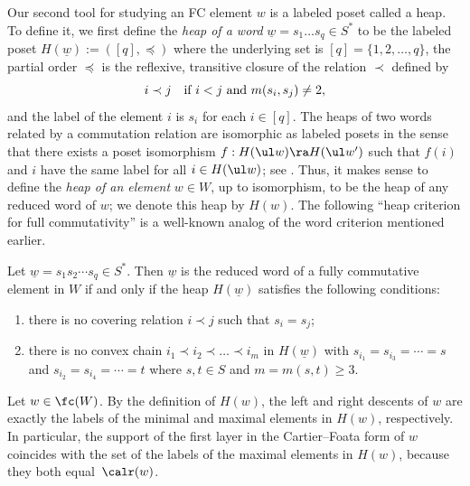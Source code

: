 Our second tool for studying an FC element $w$ is a labeled poset called a {heap}. To define it, we
first define the \emph{heap of a word} $\underline w=s_1\dots s_q\in S^*$ to be the labeled poset
$H(\underline w):=([q], \preceq)$ where the underlying set is $[q]=\{1,2,\dots,q\}$, the partial
order $\preceq$ is the reflexive, transitive closure of the relation $\prec$ defined by \[ i\prec j
\text{\quad if $i< j$ and $m(s_i,s_j)\neq 2$}, \] and the label of the element $i$ is $s_i$ for each
$i\in [q]$.  The heaps of two words related by a commutation relation are isomorphic as labeled
posets in the sense that there exists a poset isomorphism $f:H({\ul w})\ra H({\ul w'})$ such that
$f(i)$ and $i$ have the same label for all $i\in H({\ul w})$; see \cite[\S 2.2]{FC}.  Thus, it makes
sense to define the \emph{heap of an element} $w\in W$, up to isomorphism, to be the heap of any
reduced word of $w$; we denote this heap by $H(w)$. The following ``heap criterion for full
commutativity'' is a well-known analog of the word criterion mentioned earlier. 

\begin{prop}[{\cite[Proposition 3.3]{FC}}]
    \label{prop:FCCriterion}
    Let  $\underline w= s_1s_2\cdots s_q\in S^*$. Then $\underline w$ is the reduced word of a fully commutative
    element in $W$ if and only if the heap $H(\underline w)$ satisfies the following conditions: 
    \begin{enumerate}
        \item there is no covering relation $i\prec j$ such that $s_i=s_j$;
        \item there is no convex chain $i_1\prec i_2\prec \ldots \prec i_m$ in $H(\underline w)$ with
             $s_{i_1}=s_{i_3}=\cdots = s$ and $s_{i_2}=s_{i_4}=\cdots=t$ where $s,t\in S$ and $m = m(s,t)\ge 3$.
    \end{enumerate} 
\end{prop}

\begin{remark}
    Let $w\in \fc(W)$.  By the  definition of $H(w)$, the left and right descents of $w$ are exactly
    the labels of the minimal and maximal elements in $H(w)$, respectively. In particular, the
    support of the first layer in the Cartier--Foata form of $w$ coincides with the set of the
    labels of the maximal elements in $H(w)$, because they both equal~$\calr(w)$.
    \label{rmk:heapsAndWords}
\end{remark}

